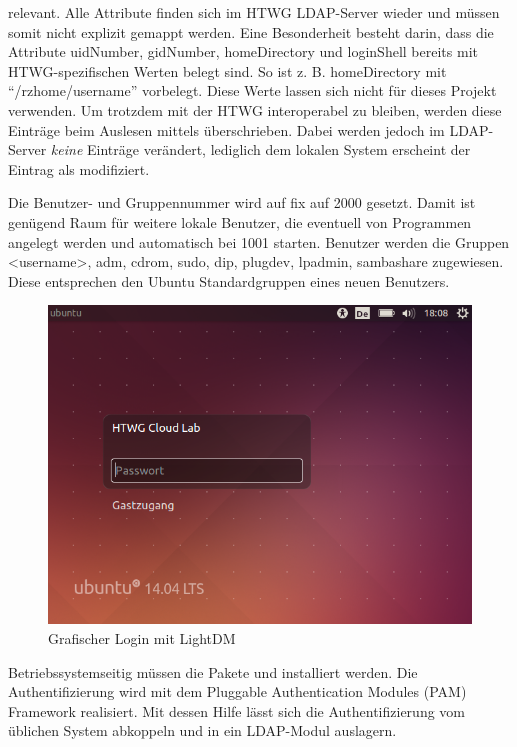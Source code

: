relevant. Alle Attribute finden sich im HTWG LDAP-Server wieder und müssen somit nicht explizit gemappt werden. 
Eine Besonderheit besteht darin, dass die Attribute uidNumber, gidNumber, homeDirectory und loginShell bereits mit HTWG-spezifischen Werten belegt sind. 
So ist z. B. homeDirectory mit \enquote{/rzhome/username} vorbelegt.
Diese Werte lassen sich nicht für dieses Projekt verwenden.
Um trotzdem mit der HTWG interoperabel zu bleiben, werden diese Einträge beim Auslesen mittels  überschrieben. 
Dabei werden jedoch im LDAP-Server \emph{keine} Einträge verändert, lediglich dem lokalen System erscheint der Eintrag als modifiziert.

Die Benutzer- und Gruppennummer wird auf fix auf 2000 gesetzt.
Damit ist genügend Raum für weitere lokale Benutzer, die eventuell von Programmen angelegt werden und automatisch bei 1001 starten.
Benutzer werden die Gruppen <username>, adm, cdrom, sudo, dip, plugdev, lpadmin, sambashare zugewiesen. 
Diese entsprechen den Ubuntu Standardgruppen eines neuen Benutzers.

\begin{figure}[htbp]
\centering
\includegraphics[scale=0.6]{img/lightdm.png}
\caption{Grafischer Login mit LightDM}
\label{lightdm}
\end{figure}

Betriebssystemseitig müssen die Pakete  und  installiert werden. 
Die Authentifizierung wird mit dem Pluggable Authentication Modules (PAM) Framework realisiert. 
Mit dessen Hilfe lässt sich die Authentifizierung vom üblichen System abkoppeln und in ein LDAP-Modul auslagern.

